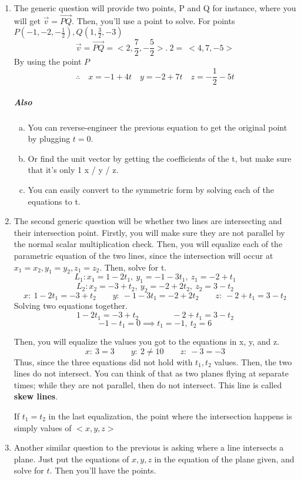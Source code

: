 \documentclass{article}
\begin{document}
	\begin{enumerate}[1.]
		\item The generic question will provide two points, P and Q for instance, where you will get $ \vec{ v } = \vec{ PQ } $. Then, you'll use a point to solve. For points $ P(-1,-2,-\frac{1}{2}), Q(1,\frac{3}{2}, -3	)$
			\[
				\vec{ v } = \vec{ PQ } = <2, \frac{7}{2}, -\frac{5}{2}> .\ 2 =\  <4,7,-5>
			\]
			By using the point $P$
			\[
				\therefore \quad x = -1+4t \quad y=-2+7t \quad z=-\frac{1}{2}-5t
			\]
			\subparagraph{Also}
			\begin{enumerate}[a.]
				\item  	You can reverse-engineer the previous equation to get the original point by plugging $t=0$.
				\item Or find  the unit vector by getting the coefficients of the t, but make sure that it's only 1 x / y / z.
				\item  You can easily convert to the symmetric form by solving each of the equations to t.
			\end{enumerate}
		\item The second generic question will be whether two lines are intersecting and their intersection point. Firstly, you will make sure they are not parallel by the normal scalar multiplication check. Then, you will equalize each of the parametric equation of the two lines, since the intersection will occur at $x_1=x_2, y_1=y_2, z_1=z_2$. Then, solve for t.
			\[
				L_1 : x_1=1-2t_1,\ y_1 = -1-3t_1,\ z_1=-2+t_1
			\]
			\[
				L_2: x_2=-3+t_2,\ y_2=-2+2t_2,\ z_2=3-t_2
			\]
			\[
				x:\ 1-2t_1 = -3+t_2 \qquad y:\ -1-3t_1=-2+2t_2 \qquad z:\ -2+t_1 = 3-t_2 
			\]
			Solving two equations together.
			\[1-2t_1=-3+t_2 \qquad	\qquad -2+t_1=3-t_2\]
			\[
				-1-t_1=0 \implies t_1=-1,\ t_2=6
			\]

			Then, you will equalize the values you got to the equations in x, y, and z.
			\[
				x:\ 3=3 \qquad y:\ 2 \neq  10 \qquad z:\ -3=-3
			\]
			Thus, since the three equations did not hold with $ t_1, t_2 $ values. Then, the two lines do not intersect. You can think of that as two planes flying at separate times; while they are not parallel, then do not intersect. This line is called \textbf{skew lines}.  

			If $t_1=t_2$ in the last equalization, the point where the intersection happens is simply values of $ <x,y,z> $ 

		\item Another similar question to the previous is asking where a line intersects a plane. Just put the equations of $x,y,z$ in the equation of the plane given, and solve for $t$. Then you'll have the points. 


\end{enumerate}
\end{document}
